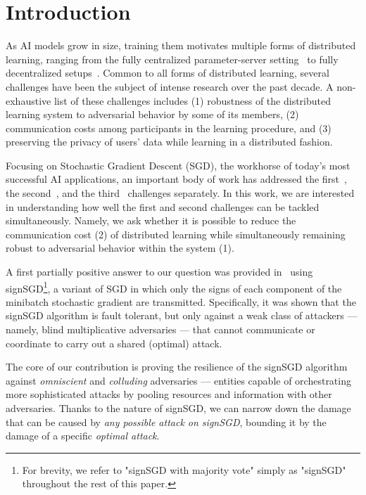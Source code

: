 \section{Introduction}



As AI models grow in size, training them motivates multiple forms of distributed learning, ranging from the fully centralized parameter-server setting~\cite{li2014scaling} to fully decentralized setups~\cite{jungle}. Common to all forms of distributed learning, several challenges have been the subject of intense research over the past decade. A non-exhaustive list of these challenges includes (1) robustness of the distributed learning system to adversarial behavior by some of its members, (2) communication costs among participants in the learning procedure, and (3) preserving the privacy of users' data while learning in a distributed fashion.

Focusing on Stochastic Gradient Descent (SGD), the workhorse of today's most successful AI applications, an important body of work has addressed the first~\cite{blanchard2017machine, el2020robust, lilisu, jungle, alistarh2018byzantine, tournesol, boussetta2021aksel, rouault2022practical}, the second~\cite{qsgd, gandikota2021vqsgd, karimireddy2019error, haddadpour2021federated}, and the third~\cite{ji2014differential, li2020privacy, kairouz2021distributed, fang2021privacy, sun2018private} challenges separately. In this work, we are interested in understanding how well the first and second challenges can be tackled simultaneously. Namely, we ask whether it is possible to reduce the communication cost (2) of distributed learning while simultaneously remaining robust to adversarial behavior within the system (1).

A first partially positive answer to our question was provided in~\cite{bernstein2018signsgd} using signSGD\footnote{For brevity, we refer to "signSGD with majority vote" simply as "signSGD" throughout the rest of this paper.}, a variant of SGD in which only the signs of each component of the minibatch stochastic gradient are transmitted. Specifically, it was shown that the signSGD algorithm is fault tolerant, but only against a weak class of attackers — namely, blind multiplicative adversaries — that cannot communicate or coordinate to carry out a shared (optimal) attack.

The core of our contribution is proving the resilience of the signSGD algorithm against \emph{omniscient} and \emph{colluding} adversaries — entities capable of orchestrating more sophisticated attacks by pooling resources and information with other adversaries. Thanks to the nature of signSGD, we can narrow down the damage that can be caused by \emph{any possible attack on signSGD}, bounding it by the damage of a specific \emph{optimal attack}.

